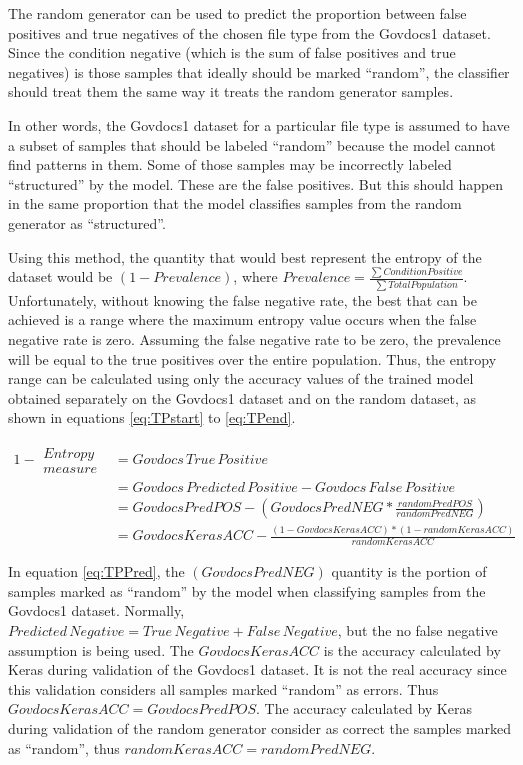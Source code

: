 The random generator can be used to predict the proportion between false positives and true negatives of the chosen file type from the Govdocs1 dataset. Since the condition negative (which is the sum of false positives and true negatives) is those samples that ideally should be marked ``random'', the classifier should treat them the same way it treats the random generator samples.

In other words, the Govdocs1 dataset for a particular file type is assumed to have a subset of samples that should be labeled ``random'' because the model cannot find patterns in them. Some of those samples may be incorrectly labeled ``structured'' by the model. These are the false positives. But this should happen in the same proportion that the model classifies samples from the random generator as ``structured''.

Using this method, the quantity that would best represent the entropy of the dataset would be $(1-Prevalence)$, where  $Prevalence=\frac{\sum ConditionPositive}{\sum TotalPopulation}$. Unfortunately, without knowing the false negative rate, the best that can be achieved is a range where the maximum entropy value occurs when the false negative rate is zero. Assuming the false negative rate to be zero, the prevalence will be equal to the true positives over the entire population. Thus, the entropy range can be calculated using only the accuracy values of the trained model obtained separately on the Govdocs1 dataset and on the random dataset, as shown in equations \ref{eq:TPstart} to \ref{eq:TPend}.

\begin{align}
\label{eq:TPstart}
    1-\begin{matrix}
    Entropy\\
    measure
    \end{matrix}
      &= Govdocs\,True\,Positive \\
      &= Govdocs\,Predicted\,Positive - Govdocs\,False\,Positive\\
      &= GovdocsPredPOS - \left(GovdocsPredNEG*\frac{randomPredPOS}{randomPredNEG}\right)\label{eq:TPPred}\\
      &= GovdocsKerasACC - \frac{(1-GovdocsKerasACC)*(1-randomKerasACC)}{randomKerasACC}
      \label{eq:TPend}
\end{align}

In equation \ref{eq:TPPred}, the $(GovdocsPredNEG)$ quantity is the portion of samples marked as ``random'' by the model when classifying samples from the Govdocs1 dataset. Normally, $Predicted\,Negative = True\,Negative + False\, Negative$, but the no false negative assumption is being used. The $GovdocsKerasACC$ is the accuracy calculated by Keras during validation of the Govdocs1 dataset. It is not the real accuracy since this validation considers all samples marked ``random'' as errors. Thus $GovdocsKerasACC = GovdocsPredPOS$. The accuracy calculated by Keras during validation of the random generator consider as correct the samples marked as ``random'', thus $randomKerasACC = randomPredNEG$.

